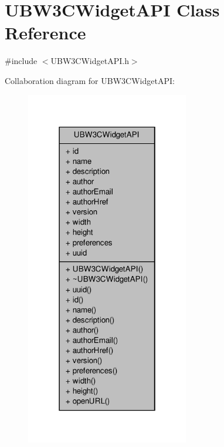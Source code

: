 \hypertarget{class_u_b_w3_c_widget_a_p_i}{\section{U\-B\-W3\-C\-Widget\-A\-P\-I Class Reference}
\label{da/d8c/class_u_b_w3_c_widget_a_p_i}
}


{\ttfamily \#include $<$U\-B\-W3\-C\-Widget\-A\-P\-I.\-h$>$}



Collaboration diagram for U\-B\-W3\-C\-Widget\-A\-P\-I\-:
\nopagebreak
\begin{figure}[H]
\begin{center}
\leavevmode
\includegraphics[width=202pt]{da/dc9/class_u_b_w3_c_widget_a_p_i__coll__graph}
\end{center}
\end{figure}
